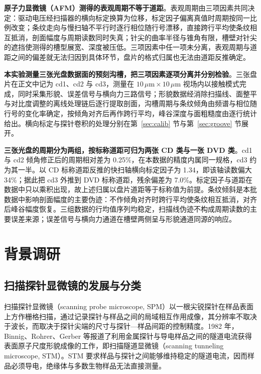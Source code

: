 \documentclass[12pt,a4paper,fontset=windows]{ctexart}
\begin{document}
\textbf{原子力显微镜（AFM）测得的表观周期不等于道距}。表观周期由三项因素共同决定：驱动电压经扫描器的横向标定换算为位移，标定因子偏离真值时周期按同一比例改变；条纹走向与慢扫轴不平行时逐行相位随行号漂移，直接跨行平均使条纹相互抵消，剖面幅度与周期读数同时失真；针尖的曲率半径与锥角有限，槽壁对针尖的遮挡使测得的槽型展宽、深度被压低。三项因素中任一项未分离，表观周期与道距之间的偏差就无法归因到具体环节，盘片的格式归属也无法由道距反推确定。

\textbf{本实验测量三张光盘数据面的预刻沟槽，把三项因素逐项分离并分别检验}。三张盘片在正文中记为 cd1、cd2 与 cd3，测量在 $10\,\mu\mathrm{m}\times10\,\mu\mathrm{m}$ 视场内以接触模式完成，同时采集形貌、误差信号与横向力三路信号；形貌数据经消除扫描线、面整平与对比度调整的离线处理链后逐行提取剖面，沟槽周期与条纹倾角由频谱与相位随行号的变化率确定，按倾角对齐后再作跨行平均，峰谷深度与面粗糙度由逐行统计给出。横向标定与探针卷积的处理分别在第~\ref{sec:calib} 节与第~\ref{sec:groove} 节展开。

\textbf{三张光盘的周期分为两组，按标称道距可归为两张 CD 类与一张 DVD 类}。cd1 与 cd2 倾角修正后的周期相对差为 0.25\%，在本数据的精度内属同一规格，cd3 约为其一半。以 CD 标称道距反推的快扫轴横向标定因子为 1.34，即该轴读数偏大 34\%；据此把 cd3 外推到 DVD 标称道距，残余偏差为 7.0\%。标定因子与道距在数据中只以乘积出现，故上述归属以盘片道距等于标称值为前提。条纹倾斜是本批数据中影响剖面幅度的主要伪迹：不作倾角对齐时跨行平均使条纹相互抵消，对齐后峰谷幅度恢复。三组数据的行均值序列均稳定，扫描线伪迹不构成周期读数的主要误差来源；误差信号与横向力通道在槽壁两侧呈与形貌通道同源的响应。

\newpage
\section{背景调研}\label{sec:bg}

\subsection{扫描探针显微镜的发展与分类}

扫描探针显微镜（scanning probe microscope, SPM）以一根尖锐探针在样品表面上方作栅格扫描，通过记录探针与样品之间的局域相互作用成像，其分辨率不取决于波长，而取决于探针尖端的尺寸与探针—样品间距的控制精度。1982 年，Binnig、Rohrer、Gerber 等报道了利用金属探针与导电样品之间的隧道电流获得表面原子尺度形貌成像的工作，即扫描隧道显微镜（scanning tunneling microscope, STM）\cite{binnig1982}。STM 要求样品与探针之间能够维持稳定的隧道电流，因而样品必须导电，绝缘体与多数生物样品无法直接测量。
\end{document}
